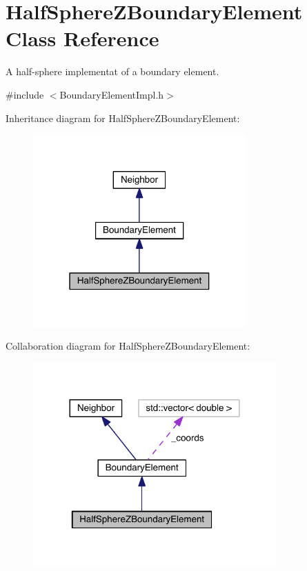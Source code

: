\hypertarget{classHalfSphereZBoundaryElement}{\section{Half\+Sphere\+Z\+Boundary\+Element Class Reference}
\label{classHalfSphereZBoundaryElement}
}


A half-\/sphere implementat of a boundary element.  




{\ttfamily \#include $<$Boundary\+Element\+Impl.\+h$>$}



Inheritance diagram for Half\+Sphere\+Z\+Boundary\+Element\+:\nopagebreak
\begin{figure}[H]
\begin{center}
\leavevmode
\includegraphics[width=232pt]{classHalfSphereZBoundaryElement__inherit__graph}
\end{center}
\end{figure}


Collaboration diagram for Half\+Sphere\+Z\+Boundary\+Element\+:\nopagebreak
\begin{figure}[H]
\begin{center}
\leavevmode
\includegraphics[width=264pt]{classHalfSphereZBoundaryElement__coll__graph}
\end{center}
\end{figure}
